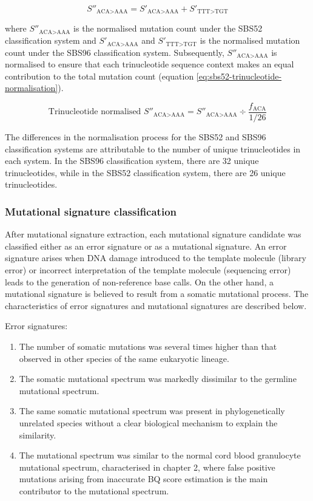 \begin{equation} 
\label{eq:sbs96-to-sbs52}
S''_{\text{ACA>AAA}} = S'_{\text{ACA>AAA}} + S'_{\text{TTT>TGT}}
\end{equation}

where $S''_{\text{ACA>AAA}}$ is the normalised mutation count under the SBS52 classification system and $S'_{\text{ACA>AAA}} $ and $S'_{\text{TTT>TGT}}$ is the normalised mutation count under the SBS96 classification system.  Subsequently, $S''_{\text{ACA>AAA}}$ is normalised to ensure that each trinucleotide sequence context makes an equal contribution to the total mutation count (equation \ref{eq:sbs52-trinucleotide-normalisation}).

\begin{equation} 
\label{eq:sbs52-trinucleotide-normalisation}
\text{Trinucleotide normalised } S''_{\text{ACA>AAA}} = S''_{\text{ACA>AAA}} \div \frac{f_{\text{ACA}}}{1/26}
\end{equation}

The differences in the normalisation process for the SBS52 and SBS96 classification systems are attributable to the number of unique trinucleotides in each system. In the SBS96 classification system, there are 32 unique trinucleotides, while in the SBS52 classification system, there are 26 unique trinucleotides. 


\subsubsection{Mutational signature classification}

After mutational signature extraction, each mutational signature candidate was classified either as an error signature or as a mutational signature. An error signature arises when DNA damage introduced to the template molecule (library error) or incorrect interpretation of the template molecule (sequencing error) leads to the generation of non-reference base calls. On the other hand, a mutational signature is believed to result from a somatic mutational process. The characteristics of error signatures and mutational signatures are described below.

\begin{description}
    \item[Error signatures:]
\end{description}
\begin{enumerate}
\item The number of somatic mutations was several times higher than that observed in other species of the same eukaryotic lineage.
\item The somatic mutational spectrum was markedly dissimilar to the germline mutational spectrum. 
\item The same somatic mutational spectrum was present in phylogenetically unrelated species without a clear biological mechanism to explain the similarity.
\item The mutational spectrum was similar to the normal cord blood granulocyte mutational spectrum, characterised in chapter 2, where false positive mutations arising from inaccurate BQ score estimation is the main contributor to the mutational spectrum. 
\end{enumerate}

